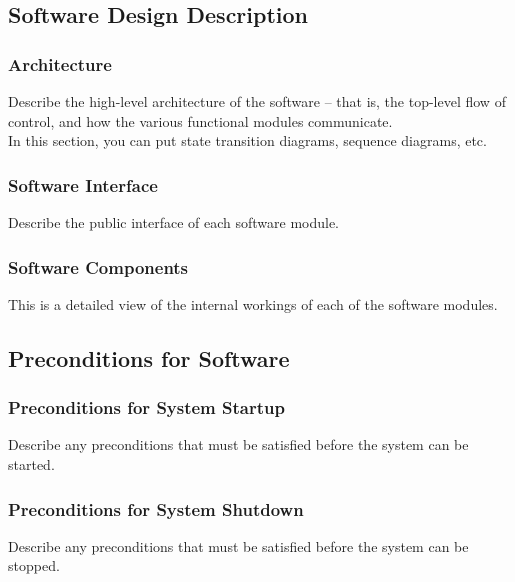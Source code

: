 \documentclass{article}
\begin{document}
\subsection{Software Design Description}
\subsubsection{Architecture}
Describe the high-level architecture of the software – that is, the top-level flow of control, and how the various functional modules communicate.\\
In this section, you can put state transition diagrams, sequence diagrams, etc.
\subsubsection{Software Interface}
Describe the public interface of each software module.
\subsubsection{Software Components}
This is a detailed view of the internal workings of each of the software modules.

\subsection{Preconditions for Software}
\subsubsection{Preconditions for System Startup}
Describe any preconditions that must be satisfied before the system can be started.
\subsubsection{Preconditions for System Shutdown}
Describe any preconditions that must be satisfied before the system can be stopped.
\end{document}
